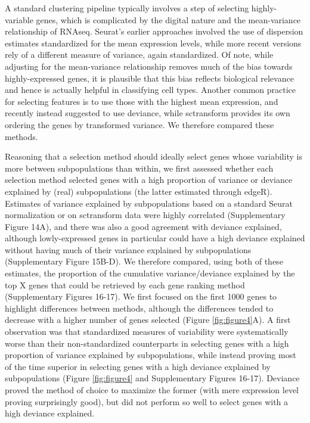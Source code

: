 \documentclass{bmcart}
\begin{document}
A standard clustering pipeline typically involves a step of selecting highly-variable genes, which is complicated by the digital nature and the mean-variance relationship of RNAseq. Seurat's earlier approaches involved the use of dispersion estimates standardized for the mean expression levels, while more recent versions rely of a different measure of variance, again standardized. Of note, while adjusting for the mean-variance relationship removes much of the bias towards highly-expressed genes, it is plausible that this bias reflects biological relevance and hence is actually helpful in classifying cell types. Another common practice for selecting features is to use those with the highest mean expression, and recently \citep{townesGlmpca2019} instead suggested to use deviance, while sctransform provides its own ordering the genes by transformed variance. We therefore compared these methods.

Reasoning that a selection method should ideally select genes whose variability is more between subpopulations than within, we first assessed whether each selection method selected genes with a high proportion of variance or deviance explained by (real) subpopulations (the latter estimated through edgeR). Estimates of variance explained by subpopulations based on a standard Seurat normalization or on sctransform data were highly correlated (Supplementary Figure 14A), and there was also a good agreement with deviance explained, although lowly-expressed genes in particular could have a high deviance explained without having much of their variance explained by subpopulations (Supplementary Figure 15B-D). We therefore compared, using both of these estimates, the proportion of the cumulative variance/deviance explained by the top X genes that could be retrieved by each gene ranking method (Supplementary Figures 16-17). We first focused on the first 1000 genes to highlight differences between methods, although the differences tended to decrease with a higher number of genes selected (Figure \ref{fig:figure4}A). A first observation was that standardized measures of variability were systematically worse than their non-standardized  counterparts in selecting genes with a high proportion of variance explained by subpopulations, while instead proving most of the time superior in selecting genes with a high deviance explained by subpopulations (Figure \ref{fig:figure4} and Supplementary Figures 16-17). Deviance proved the method of choice to maximize the former (with mere expression level proving surprisingly good), but did not perform so well to select genes with a high deviance explained.
\end{document}
